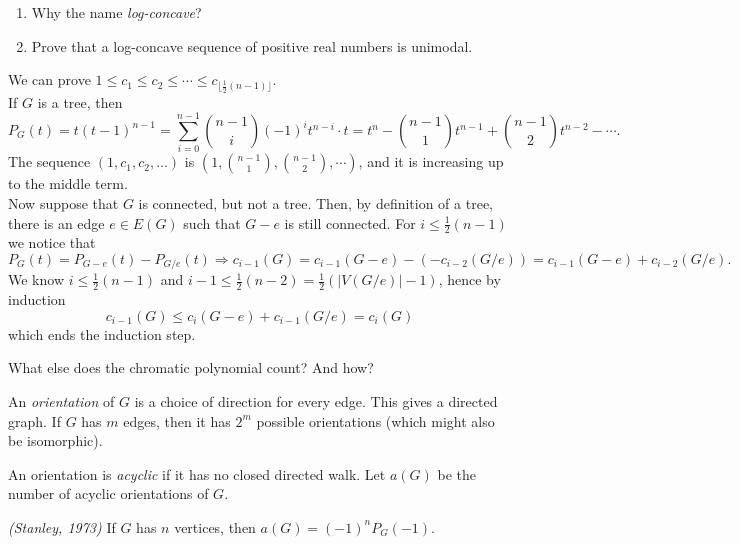 \begin{enumerate}
\item Why the name \textit{log-concave}?
\item Prove that a log-concave sequence of positive real numbers is unimodal.
\end{enumerate}

\begin{remark} We can prove $1 \leqslant c_1 \leqslant c_2 \leqslant \cdots \leqslant c_{\lfloor \frac{1}{2}(n-1)\rfloor}$.
\\ If $G$ is a tree, then
$$P_G(t)=t(t-1)^{n-1}=\sum_{i=0}^{n-1} {n-1 \choose i}(-1)^it^{n-i}\cdot t=t^n-{n-1 \choose 1}t^{n-1}+{n-1 \choose 2}t^{n-2}-\cdots.$$
The sequence $(1,c_1,c_2,\dots)$ is $(1,{n-1 \choose 1},{n-1 \choose 2},\cdots)$, and it is increasing up to the middle term.
\\ Now suppose that $G$ is connected, but not a tree. Then, by definition of a tree, there is an edge $e\in E(G)$ such that $G-e$ is still connected. For $i\leqslant \frac{1}{2}(n-1)$ we notice that
$$P_G(t)=P_{G-e}(t)-P_{G/e}(t) \Longrightarrow c_{i-1}(G)=c_{i-1}(G-e)-(-c_{i-2}(G/e))=c_{i-1}(G-e)+c_{i-2}(G/e).$$
We know $i\leqslant \frac{1}{2}(n-1)$ and $i-1 \leqslant \frac{1}{2}(n-2)=\frac{1}{2}(|V(G/e)|-1)$, hence by induction 
 $$c_{i-1}(G)\leqslant c_i(G-e)+c_{i-1}(G/e)=c_i(G)$$
which ends the induction step.
\end{remark}


What else does the chromatic polynomial count? And how?

\begin{definition} An \emph{orientation} of $G$ is a choice  of direction for every edge. This gives a directed graph. If $G$ has $m$ edges, then it has $2^m$ possible orientations (which might also be isomorphic).
\end{definition}

\begin{definition} An orientation is \emph{acyclic} if it has no closed directed walk. Let $a(G)$ be the number of acyclic orientations of $G$.
\end{definition}

\begin{theorem} \emph{(Stanley, 1973)}
If $G$ has $n$ vertices, then $a(G)=(-1)^nP_G(-1)$.
\end{theorem}

